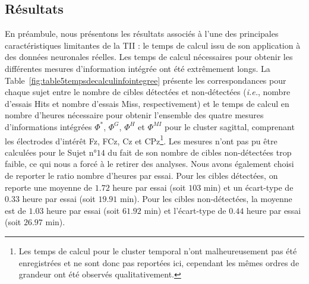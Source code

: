 \subsection{Résultats}
\label{resultatstii}

En préambule, nous présentons les résultats associés à l'une des principales caractéristiques limitantes de la TII : le temps de calcul issu de son application à des données neuronales réelles. 
Les temps de calcul nécessaires pour obtenir les différentes mesures d'information intégrée ont été extrêmement longs. 
La Table~\ref{fig:table5tempsdecalculinfointegree} présente les correspondances pour chaque sujet entre le nombre de cibles détectées et non-détectées (\textit{i.e.}, nombre d'essais Hits et nombre d'essais Miss, respectivement) et le temps de calcul en nombre d'heures nécessaire pour obtenir l'ensemble des quatre mesures d'informations intégrées $\Phi^*$, $\Phi^G$, $\Phi^H$ et $\Phi^{MI}$ pour le cluster sagittal, comprenant les électrodes d'intérêt Fz, FCz, Cz et CPz\footnote{Les temps de calcul pour le cluster temporal n'ont malheureusement pas été enregistrées et ne sont donc pas reportées ici, cependant les mêmes ordres de grandeur ont été observés qualitativement.}.
Les mesures n'ont pas pu être calculées pour le Sujet n°$14$ du fait de son nombre de cibles non-détectées trop faible, ce qui nous a forcé à le retirer des analyses. 
Nous avons également choisi de reporter le ratio nombre d'heures par essai. 
Pour les cibles détectées, on reporte une moyenne de $1.72$ heure par essai (soit $103$ min) et un écart-type de $0.33$ heure par essai (soit $19.91$ min). 
Pour les cibles non-détectées, la moyenne est de $1.03$ heure par essai (soit $61.92$ min) et l'écart-type de $0.44$ heure par essai (soit $26.97$ min). 

